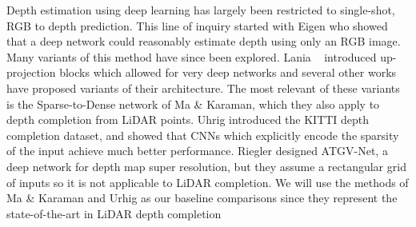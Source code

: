 Depth estimation using deep learning has largely been restricted to single-shot, RGB to depth prediction. This line of inquiry started with Eigen \etal\cite{eigen2014depth} who showed that a deep network could reasonably estimate depth using only an RGB image. Many variants of this method have since been explored\cite{kuznietsov2017semi,godard2016unsupervised,liu2015deep}. Lania \etal~\cite{laina2016deeper} introduced up-projection blocks which allowed for very deep networks and several other works have proposed variants of their architecture. The most relevant of these variants is the Sparse-to-Dense network of Ma \& Karaman\cite{sparsetodense}, which they also apply to depth completion from LiDAR points. Uhrig \etal\cite{uhrig} introduced the KITTI depth completion dataset, and showed that CNNs which explicitly encode the sparsity of the input achieve much better performance. Riegler \etal\cite{riegler} designed ATGV-Net, a deep network for depth map super resolution, but they assume a rectangular grid of inputs so it is not applicable to LiDAR completion. We will use the methods of Ma \& Karaman and Urhig \etal as our baseline comparisons since they represent the state-of-the-art in LiDAR depth completion